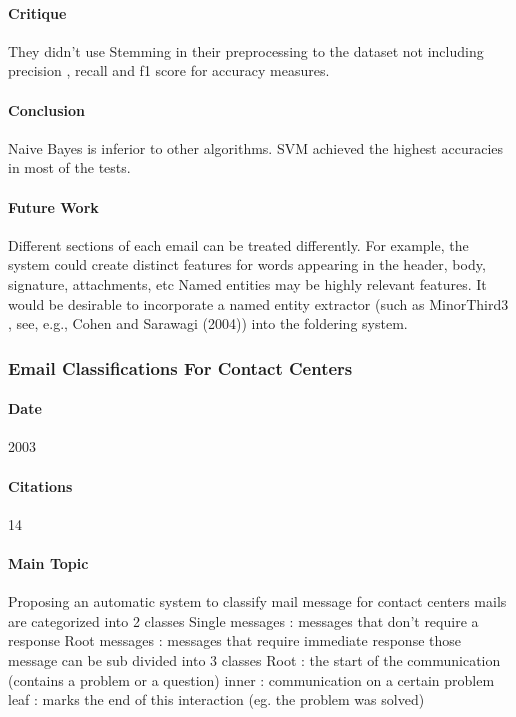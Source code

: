\documentclass[12pt]{article}
\begin{document}
\paragraph{Critique}
They didn’t use Stemming in their preprocessing to the dataset
not including precision , recall and f1 score for accuracy measures.

\paragraph{Conclusion}
Naive Bayes is inferior to other algorithms.
SVM achieved the highest accuracies in most of the tests.

\paragraph{Future Work}
Different sections of each email can be treated differently. For example, the system could create distinct features for words appearing in the header, body, signature, attachments, etc
Named entities may be highly relevant features. It would be desirable to incorporate a named entity extractor (such as MinorThird3 , see, e.g., Cohen and Sarawagi (2004)) into the foldering system.





\subsubsection{Email Classifications For Contact Centers}
\paragraph{Date} 2003
\paragraph{Citations} 14
\paragraph{Main Topic}
Proposing an automatic system to classify mail message for contact centers
mails are categorized into 2 classes
Single messages : messages that don’t require a response
Root messages : messages that require immediate response
those message can be sub divided into 3 classes
Root : the start of the communication (contains a problem or a question)
inner : communication on a certain problem
leaf : marks the end of this interaction (eg. the problem was solved)
\end{document}
